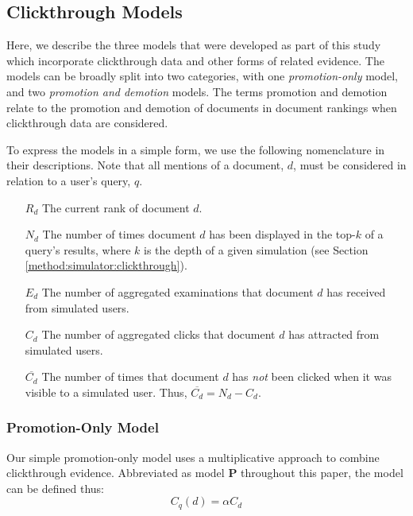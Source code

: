 \subsection{Clickthrough Models}\label{sec:method:models}
Here, we describe the three models that were developed as part of this study which incorporate clickthrough data and other forms of related evidence. The models can be broadly split into two categories, with one \emph{promotion-only} model, and two \emph{promotion and demotion} models. The terms promotion and demotion relate to the promotion and demotion of documents in document rankings when clickthrough data are considered.

To express the models in a simple form, we use the following nomenclature in their descriptions. Note that all mentions of a document, $d$, must be considered in relation to a user's query, $q$.

\begin{itemize}
	
	\item[$R_d$]{The current rank of document $d$.}
	
	\item[$N_d$]{The number of times document $d$ has been displayed in the top-$k$ of a query's results, where $k$ is the depth of a given simulation (see Section \ref{method:simulator:clickthrough}).}
	
	\item[$E_d$]{The number of aggregated examinations that document $d$ has received from simulated users.}
	
	\item[$C_d$]{The number of aggregated clicks that document $d$ has attracted from simulated users.}
	
	\item[$\overline{C_d}$]{The number of times that document $d$ has \emph{not} been clicked when it was visible to a simulated user. Thus, $\overline{C_d} = N_d - C_d$.}
	
\end{itemize}

\subsubsection{Promotion-Only Model}\label{sec:method:models:promo}
Our simple promotion-only model uses a multiplicative approach to combine clickthrough evidence. Abbreviated as model \textbf{P} throughout this paper, the model can be defined thus:
\vspace{-0.1cm}
\begin{equation}
	C_q(d) = \alpha C_d
	\label{eqn:p}
\end{equation}

